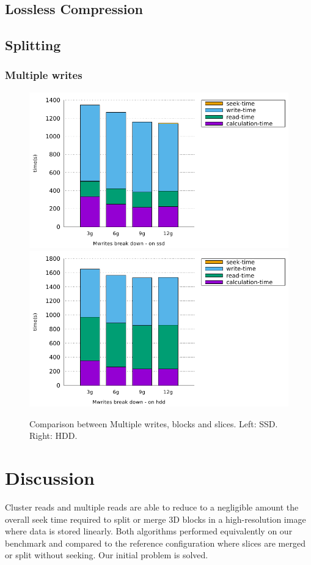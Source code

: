 \documentclass[10pt, conference, compsocconf]{IEEEtran}
\begin{document}
\subsection{Lossless Compression}

\subsection{Splitting}

\subsubsection{Multiple writes}
\begin{figure}[h]
  \centering
  \includegraphics[width=0.45\columnwidth]{figures/benchmark-mwrites/mwrites-breakdown-ssd.pdf}
  \hfill
    \includegraphics[width=0.45\columnwidth]{figures/benchmark-mwrites/mwrites-breakdown-hdd.pdf}
  \caption{Comparison between Multiple writes, blocks and slices. Left: SSD. Right: HDD.}
\label{fig:multiple-writes}
\end{figure}


\newpage

\section{Discussion}
\label{sec:discussion}

Cluster reads and multiple reads are able to reduce to a negligible
amount the overall seek time required to split or merge 3D blocks in a
high-resolution image where data is stored linearly. Both algorithms
performed equivalently on our benchmark and compared to the reference
configuration where slices are merged or split without seeking. Our
initial problem is solved.
\end{document}
